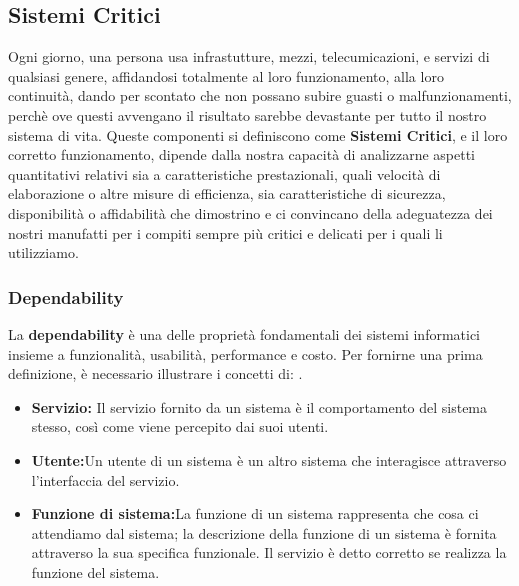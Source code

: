 \documentclass[14pt]{extarticle}
\begin{document}
\subsection{Sistemi Critici}
Ogni giorno, una persona usa infrastutture, mezzi, telecumicazioni, e servizi di qualsiasi genere, affidandosi totalmente al loro funzionamento, alla loro continuità, dando per scontato che non possano subire guasti o malfunzionamenti, perchè ove questi avvengano il risultato sarebbe devastante per tutto il nostro sistema di vita. Queste componenti si definiscono come \textbf{Sistemi Critici}, e  il loro corretto funzionamento, dipende dalla nostra capacità di analizzarne aspetti quantitativi relativi sia a caratteristiche prestazionali, quali velocità di elaborazione o altre misure di efficienza,
sia caratteristiche di sicurezza, disponibilità o affidabilità che dimostrino e ci
convincano della adeguatezza dei nostri manufatti per i compiti sempre più
critici e delicati per i quali li utilizziamo.

\subsubsection{Dependability}
La \textbf{dependability} è una delle proprietà fondamentali dei sistemi informatici insieme a funzionalità, usabilità, performance e costo. Per fornirne una prima definizione, è necessario illustrare i concetti di: \cite{avizienis2004basic}.
\begin{itemize}
\item \textbf{Servizio:} Il servizio fornito da un sistema è il comportamento del sistema stesso, così come viene percepito dai suoi utenti.
\item \textbf{Utente:}Un utente di un sistema è un altro sistema che interagisce attraverso l’interfaccia del servizio.
\item \textbf{Funzione di sistema:}La funzione di un sistema rappresenta che cosa ci attendiamo dal sistema; la descrizione della funzione di un sistema è fornita attraverso la sua specifica funzionale. Il servizio è detto corretto se realizza la funzione del sistema.
\end{itemize}
\end{document}
